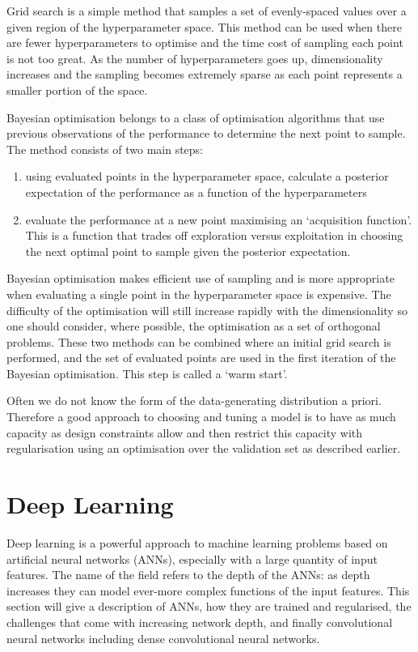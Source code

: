 Grid search is a simple method that samples a set of evenly-spaced values over a given region of the hyperparameter space. 
This method can be used when there are fewer hyperparameters to optimise and the time cost of sampling each point is not too great. 
As the number of hyperparameters goes up, dimensionality increases and the sampling becomes extremely sparse as each point represents a smaller portion of the space.

Bayesian optimisation \cite{BayesOpt} belongs to a class of optimisation algorithms that use previous observations of the performance to determine the next point to sample. 
The method consists of two main steps:
\begin{enumerate}[noitemsep]
    \item using evaluated points in the hyperparameter space, calculate a posterior expectation of the performance as a function of the hyperparameters
    \item evaluate the performance at a new point maximising an `acquisition function'. This is a function that trades off exploration versus exploitation in choosing the next optimal point to sample given the posterior expectation.
\end{enumerate}
Bayesian optimisation makes efficient use of sampling and is more appropriate when evaluating a single point in the hyperparameter space is expensive. The difficulty of the optimisation will still increase rapidly with the dimensionality so one should consider, where possible, the optimisation as a set of orthogonal problems.  
These two methods can be combined where an initial grid search is performed, and the set of evaluated points are used in the first iteration of the Bayesian optimisation. 
This step is called a `warm start'. 

Often we do not know the form of the data-generating distribution a priori. Therefore a good approach to choosing and tuning a model is to have as much capacity as design constraints allow and then restrict this capacity with regularisation using an optimisation over the validation set as described earlier.

\section{Deep Learning}
Deep learning is a powerful approach to machine learning problems based on artificial neural networks (ANNs), especially with a large quantity of input features. 
The name of the field refers to the depth of the ANNs: as depth increases they can model ever-more complex functions of the input features. 
This section will give a description of ANNs, how they are trained and regularised, the challenges that come with increasing network depth, and finally convolutional neural networks including dense convolutional neural networks.  

